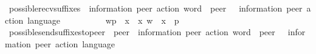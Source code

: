 \begin{isabellebody}
{}
\isamarkuptrue%
%
\endisatagdocument
{\isafolddocument}%
%
\isadelimdocument
%
\endisadelimdocument
{}\isamarkupfalse%
\ possible{\isacharunderscore}{\kern0pt}recv{\isacharunderscore}{\kern0pt}suffixes\ {\isacharcolon}{\kern0pt}{\isacharcolon}{\kern0pt}\ {\isachardoublequoteopen}{\isacharparenleft}{\kern0pt}{\isacharprime}{\kern0pt}information{\isacharcomma}{\kern0pt}\ {\isacharprime}{\kern0pt}peer{\isacharparenright}{\kern0pt}\ action\ word\ {\isasymRightarrow}\ {\isacharprime}{\kern0pt}peer\ {\isasymRightarrow}\ \ {\isacharparenleft}{\kern0pt}{\isacharprime}{\kern0pt}information{\isacharcomma}{\kern0pt}\ {\isacharprime}{\kern0pt}peer{\isacharparenright}{\kern0pt}\ action\ language{\isachardoublequoteclose}\ \ {\isacharparenleft}{\kern0pt}{\isachardoublequoteopen}{\isasymddagger}{\isacharunderscore}{\kern0pt}{\isasymddagger}\isactrlsub {\isacharunderscore}{\kern0pt}{\isachardoublequoteclose}\ {\isacharbrackleft}{\kern0pt}{}{}{\isacharcomma}{\kern0pt}\ {}{}{\isacharbrackright}{\kern0pt}\ {}{}{}{\isacharparenright}{\kern0pt}\ \ \ \isanewline
\ \ {\isachardoublequoteopen}{\isasymddagger}w{\isasymddagger}\isactrlsub p\ {\isasymequiv}\ {\isacharbraceleft}{\kern0pt}x{\isasymdown}\isactrlsub {\isacharquery}{\kern0pt}\ {\isacharbar}{\kern0pt}\ x{\isachardot}{\kern0pt}\ {\isacharparenleft}{\kern0pt}w\ {\isasymsqdot}\ x{\isacharparenright}{\kern0pt}\ {\isasymin}\ {\isasymL}\isactrlsup {\isacharasterisk}{\kern0pt}{\isacharparenleft}{\kern0pt}p{\isacharparenright}{\kern0pt}{\isacharbraceright}{\kern0pt}{\isachardoublequoteclose}\isanewline
\isanewline
\isanewline
\isanewline
{}\isamarkupfalse%
\ possible{\isacharunderscore}{\kern0pt}send{\isacharunderscore}{\kern0pt}suffixes{\isacharunderscore}{\kern0pt}to{\isacharunderscore}{\kern0pt}peer\ {\isacharcolon}{\kern0pt}{\isacharcolon}{\kern0pt}\ {\isachardoublequoteopen}{\isacharprime}{\kern0pt}peer\ {\isasymRightarrow}\ {\isacharparenleft}{\kern0pt}{\isacharprime}{\kern0pt}information{\isacharcomma}{\kern0pt}\ {\isacharprime}{\kern0pt}peer{\isacharparenright}{\kern0pt}\ action\ word\ {\isasymRightarrow}\ {\isacharprime}{\kern0pt}peer\ {\isasymRightarrow}\ \ {\isacharparenleft}{\kern0pt}{\isacharprime}{\kern0pt}information{\isacharcomma}{\kern0pt}\ {\isacharprime}{\kern0pt}peer{\isacharparenright}{\kern0pt}\ action\ language{\isachardoublequoteclose}\ \ {\isacharparenleft}{\kern0pt}{\isachardoublequoteopen}\isactrlsub {\isacharunderscore}{\kern0pt}{\isasymddagger}{\isacharunderscore}{\kern0pt}{\isasymddagger}\isactrlsub {\isacharunderscore}{\kern0pt}{\isachardoublequoteclose}\ {\isacharbrackleft}{\kern0pt}{}{}{\isacharcomma}{\kern0pt}\ {}{}{\isacharcomma}{\kern0pt}\ {}{}{\isacharbrackright}{\kern0pt}\ {}{}{}{\isacharparenright}{\kern0pt}\ \ \ \isanewline

\end{isabellebody}
